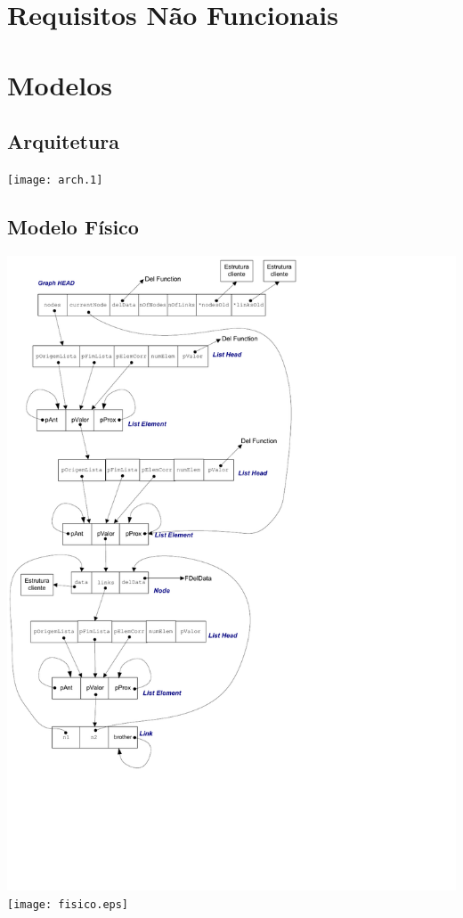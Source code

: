 \documentclass[a4paper,8pt]{article}
\begin{document}
\section{Requisitos Não Funcionais}

\section{Modelos}
\subsection{Arquitetura}

\texttt{[image: arch.1]}

\subsection{Modelo Físico}

\ifpdf
\includegraphics{fisico.pdf}
\else
\texttt{[image: fisico.eps]}
\fi
\end{document}
